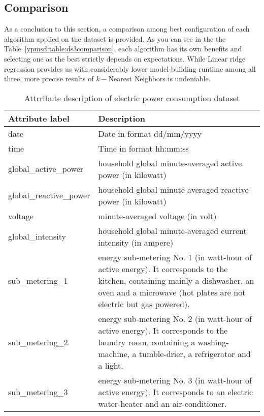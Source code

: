 \subsection{Comparison}

As a conclusion to this section, a comparison among best
configuration of each algorithm applied on the dataset is provided. As you can
see in the the Table~\ref{ypmsd:table:ds3comparison}, each algorithm has its own
benefits and selecting one as the best strictly depends on expectations.
While Linear ridge regression provides us with considerably lower model-building runtime
among all three, more precise results of $k-$Nearest Neighbors is undeniable.
















\begin{table}[p]
	\begin{center}
		\begin{tabular}{|p{4cm}|p{10cm}|}
			\hline	{\bf Attribute label}&{ \bf Description}\\
\hline date &   Date in format dd/mm/yyyy\\\hline
time &  	Time in format hh:mm:ss  \\\hline 
global\_active\_power & household global minute-averaged active power (in
kilowatt)  \\
\hline global\_reactive\_power & household global minute-averaged reactive power
(in kilowatt)  \\
\hline voltage & minute-averaged voltage (in volt)  \\
\hline global\_intensity & household global minute-averaged current intensity
(in ampere)  \\
\hline sub\_metering\_1 & energy sub-metering No. 1 (in watt-hour of active
energy). It corresponds to the kitchen, containing mainly a dishwasher, 
an oven and a microwave (hot plates are not electric but gas powered).  \\
\hline sub\_metering\_2 & energy sub-metering No. 2 (in watt-hour of active
energy). It corresponds to the laundry room, containing a washing-machine, a tumble-drier, a refrigerator and a light.  \\
\hline sub\_metering\_3 & energy sub-metering No. 3 (in watt-hour of active 
energy). It corresponds to an electric water-heater and an air-conditioner.
\\\hline
\end{tabular}
\end{center}
\caption{Attrribute description of electric power consumption
dataset\label{ypmsd:table:ds3attributes}}

\end{table}





